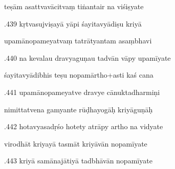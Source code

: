 \documentclass[article,12pt,a4paper]{memoir}%
\newcounter{parCount}
\begin{document}
	  
	  \pstart \leavevmode%
	teṣām asattvavācitvaṃ tiṅantair na viśiṣyate 
	{}
	\pend%
      

	  
	  \pstart {}.439 kṛtvasujviṣayā yāpi śayitavyādiṣu kriyā 
	{}
	\pend%
      

	  
	  \pstart \leavevmode%
	upamānopameyatvaṃ tatrātyantam asaṃbhavi 
	{}
	\pend%
      

	  
	  \pstart {}.440 na kevalau dravyaguṇau tadvān vāpy upamīyate 
	{}
	\pend%
      

	  
	  \pstart \leavevmode%
	śayitavyādibhis teṣu nopamārtho+asti kaś cana 
	{}
	\pend%
      

	  
	  \pstart {}.441 upamānopameyatve dravye cānuktadharmiṇi 
	{}
	\pend%
      

	  
	  \pstart \leavevmode%
	nimittatvena gamyante rūḍhayogāḥ kriyāguṇāḥ 
	{}
	\pend%
      

	  
	  \pstart {}.442 hotavyasadṛśo hotety atrāpy artho na vidyate 
	{}
	\pend%
      

	  
	  \pstart \leavevmode%
	virodhāt kriyayā tasmāt kriyāvān nopamīyate 
	{}
	\pend%
      

	  
	  \pstart {}.443 kriyā samānajātiyā tadbhāvān nopamīyate 
	{}
	\pend%
      
\end{document}
